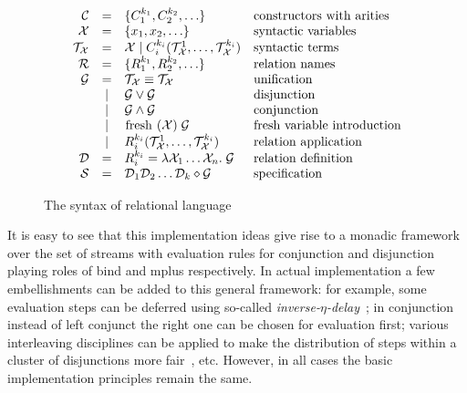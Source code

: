 \begin{figure}[t]
\[
  \begin{array}{rcll}
     \mathcal{C} & = & \{ C_1^{k_1}, C_2^{k_2}, \ldots \} 
     & \mbox{constructors with arities} 
     \\
     \mathcal{X} & = & \{x_1, x_2, \ldots \} 
     & \mbox{syntactic variables} 
     \\
     \mathcal{T}_\mathcal{X} & = & \mathcal{X} \mid C_i^{k_i}(\mathcal{T}_\mathcal{X}^1, \ldots, \mathcal{T}_\mathcal{X}^{k_i})
     & \mbox{syntactic terms} 
     \\
     \mathcal{R} & = & \{R_1^{k_1}, R_2^{k_2}, \ldots \} 
     & \mbox{relation names} 
     \\
     \mathcal{G} & =    & \mathcal{T}_\mathcal{X} \equiv \mathcal{T}_\mathcal{X} & \mbox{unification} \\
                 & \mid & \mathcal{G} \lor \mathcal{G} & \mbox{disjunction} \\
                 & \mid & \mathcal{G} \land \mathcal{G} & \mbox{conjunction} \\
                 & \mid & \mbox{\lstinline|fresh|} \; (\mathcal{X}) \; \mathcal{G} & \mbox{fresh variable introduction} \\
                 & \mid & R_i^{k_i}(\mathcal{T}_\mathcal{X}^1, \ldots, \mathcal{T}_\mathcal{X}^{k_i}) & \mbox{relation application} \\
    \mathcal{D} & = &R_i^{k_i} = \lambda \mathcal{X}_1 \ldots \mathcal{X}_n. \; \mathcal{G} & \mbox{relation definition}\\
    \mathcal{S} & = &\mathcal{D}_1\mathcal{D}_2\dots\mathcal{D}_k \diamond \mathcal{G} & \mbox{specification}
  \end{array}
\]
    \caption{The syntax of relational language}
    \label{syntax}
\end{figure}


It is easy to see that this implementation ideas give rise to a monadic framework over the set of streams with evaluation rules for conjunction and disjunction playing roles of bind and
mplus respectively. In actual implementation a few embellishments can be added to this general framework: for example, some evaluation steps can be deferred using so-called
\emph{inverse-$\eta$-delay}~\cite{MicroKanren}; in conjunction instead of left conjunct the right one can be chosen for evaluation first; various interleaving disciplines can
be applied to make the distribution of steps within a cluster of disjunctions more fair~\cite{fair:towardsAM}, etc. However, in all cases the basic implementation principles remain
the same.

